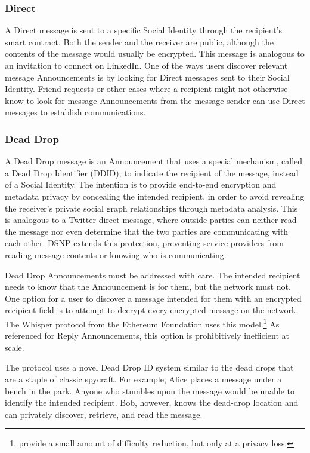 \documentclass[12pt,letterpaper]{article}
\begin{document}
\subsubsection{Direct}

A Direct message is sent to a specific Social Identity through the recipient's smart
contract. Both the sender and the receiver are public, although the contents of the
message would usually be encrypted. This message is analogous to an invitation to connect
on LinkedIn. One of the ways users discover relevant message Announcements is by looking
for Direct messages sent to their Social Identity. Friend requests or other cases where a
recipient might not otherwise know to look for message Announcements from the message
sender can use Direct messages to establish communications.

\subsubsection{Dead Drop}

A Dead Drop message is an Announcement that uses a special mechanism, called a Dead Drop
Identifier (DDID), to indicate the recipient of the message, instead of a Social Identity.
The intention is to provide end-to-end encryption and metadata privacy by concealing the
intended recipient, in order to avoid revealing the receiver's private social graph
relationships through metadata analysis. This is analogous to a Twitter direct message,
where outside parties can neither read the message nor even determine that the two parties
are communicating with each other. DSNP extends this protection, preventing service
providers from reading message contents or knowing who is communicating.

Dead Drop Announcements must be addressed with care. The intended recipient needs to know
that the Announcement is for them, but the network must not. One option for a user to
discover a message intended for them with an encrypted recipient field is to attempt to
decrypt every encrypted message on the network. The Whisper protocol from the Ethereum
Foundation uses this model.\footnote{ provide a small amount of difficulty
	reduction, but only at a privacy loss.\cite{whisper-how}} As referenced for Reply
Announcements, this option is prohibitively inefficient at scale.

The protocol uses a novel Dead Drop ID system similar to the dead drops that are a staple
of classic spycraft. For example, Alice places a message under a bench in the park. Anyone
who stumbles upon the message would be unable to identify the intended recipient. Bob,
however, knows the dead-drop location and can privately discover, retrieve, and read the
message.
\end{document}
